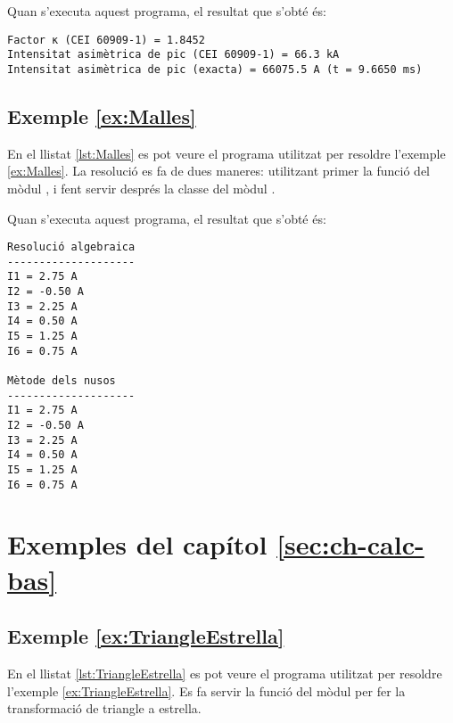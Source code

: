 Quan s'executa aquest programa, el resultat que s'obté és:
\lstset{
	language=,
	numbers=none,
	frame=none
}
\begin{lstlisting}
Factor κ (CEI 60909-1) = 1.8452
Intensitat asimètrica de pic (CEI 60909-1) = 66.3 kA
Intensitat asimètrica de pic (exacta) = 66075.5 A (t = 9.6650 ms)
\end{lstlisting}


\hypertarget{exemple:Malles}{\subsection{Exemple \ref*{ex:Malles} \Malles}}
En el llistat \vref{lst:Malles} es pot veure el programa utilitzat per resoldre l'exemple \vref{ex:Malles}. La resolució es fa de dues maneres: utilitzant primer la funció  del mòdul , i fent servir després la classe  del mòdul .


Quan s'executa aquest programa, el resultat que s'obté és:
\lstset{
	language=,
	numbers=none,
	frame=none
}
\begin{lstlisting}
Resolució algebraica
--------------------
I1 = 2.75 A
I2 = -0.50 A
I3 = 2.25 A
I4 = 0.50 A
I5 = 1.25 A
I6 = 0.75 A

Mètode dels nusos
--------------------
I1 = 2.75 A
I2 = -0.50 A
I3 = 2.25 A
I4 = 0.50 A
I5 = 1.25 A
I6 = 0.75 A
\end{lstlisting} 



\section{Exemples del capítol \ref*{sec:ch-calc-bas}}

\hypertarget{exemple:TriangleEstrella}{\subsection{Exemple \ref*{ex:TriangleEstrella} \TriangleEstrella}}
En el llistat \vref{lst:TriangleEstrella} es pot veure el programa utilitzat per resoldre l'exemple \vref{ex:TriangleEstrella}. Es fa servir la funció  del mòdul  per fer la transformació de triangle a estrella.


